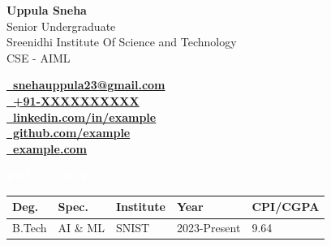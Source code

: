 \documentclass[a4paper,10pt]{article}
\newcommand{\resheading}[1]{%
  \par\vspace{8pt}\noindent
  {\colorbox{resgray}{\textcolor{white}{\textbf{\sffamily\hspace{6pt}#1\hspace{6pt}}}}}%
  \par\vspace{4pt}%
}
\begin{document}
\noindent\begin{minipage}[t]{0.58\textwidth}
{\LARGE\bfseries Uppula Sneha}\\[0.45em]
Senior Undergraduate\\

Sreenidhi Institute Of Science and Technology\\

CSE - AIML\\

\end{minipage}\hfill
\begin{minipage}[t]{0.40\textwidth}\raggedleft\small

\href{mailto:snehauppula23@gmail.com}{\bfseries\faEnvelope\ snehauppula23@gmail.com}\\


\href{tel:+91}{\bfseries\faPhone\ +91-XXXXXXXXXX}\\


\href{https://linkedin.com/in/example}{\bfseries\faLinkedin\ linkedin.com/in/example}\\


\href{https://github.com/example}{\bfseries\faGithub\ github.com/example}\\


\href{https://example.com}{\bfseries\faLink\ example.com}\\

\end{minipage}
\vspace{0.55em}


\resheading{EDUCATION}
{\setlength{\tabcolsep}{5pt}\renewcommand{\arraystretch}{1.06}%
\begin{tabular}{@{}p{1.15cm}p{2.55cm}p{2.75cm}p{1.35cm}p{1.15cm}@{}}
\toprule
\textbf{Deg.} & \textbf{Spec.} & \textbf{Institute} & \textbf{Year} & \textbf{CPI/CGPA} \\
\midrule

B.Tech & AI \& ML & SNIST & 2023-Present & 9.64 \\

\bottomrule
\end{tabular}}
\par\vspace{0.5em}
\end{document}
